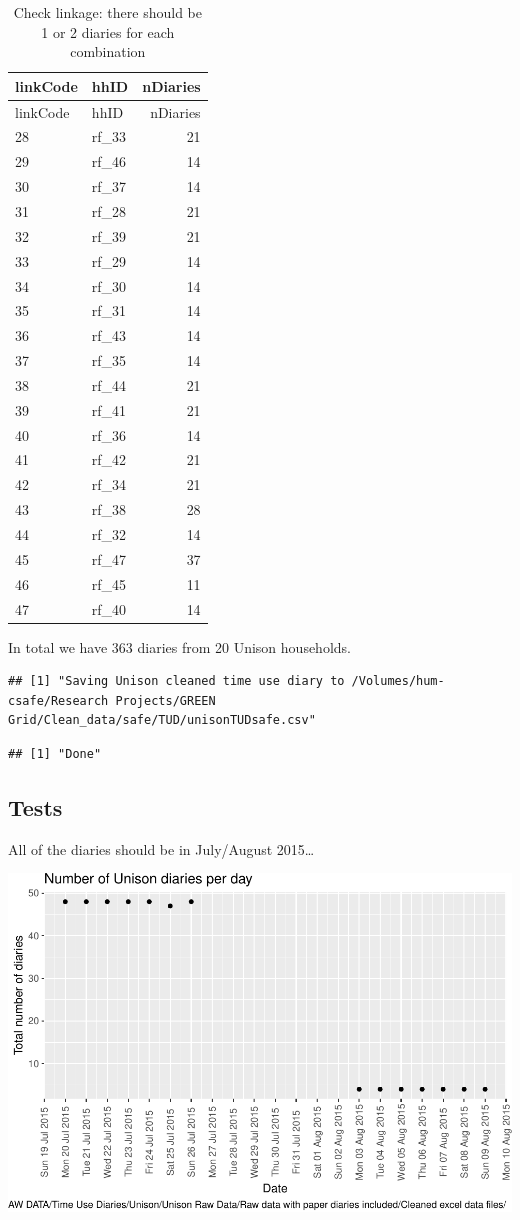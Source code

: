 \documentclass[]{article}
\begin{document}
\begin{longtable}[]{@{}llr@{}}
\caption{Check linkage: there should be 1 or 2 diaries for each
combination}\tabularnewline
\toprule
linkCode & hhID & nDiaries\tabularnewline
\midrule
\endfirsthead
\toprule
linkCode & hhID & nDiaries\tabularnewline
\midrule
\endhead
28 & rf\_33 & 21\tabularnewline
29 & rf\_46 & 14\tabularnewline
30 & rf\_37 & 14\tabularnewline
31 & rf\_28 & 21\tabularnewline
32 & rf\_39 & 21\tabularnewline
33 & rf\_29 & 14\tabularnewline
34 & rf\_30 & 14\tabularnewline
35 & rf\_31 & 14\tabularnewline
36 & rf\_43 & 14\tabularnewline
37 & rf\_35 & 14\tabularnewline
38 & rf\_44 & 21\tabularnewline
39 & rf\_41 & 21\tabularnewline
40 & rf\_36 & 14\tabularnewline
41 & rf\_42 & 21\tabularnewline
42 & rf\_34 & 21\tabularnewline
43 & rf\_38 & 28\tabularnewline
44 & rf\_32 & 14\tabularnewline
45 & rf\_47 & 37\tabularnewline
46 & rf\_45 & 11\tabularnewline
47 & rf\_40 & 14\tabularnewline
\bottomrule
\end{longtable}

In total we have 363 diaries from 20 Unison households.

\begin{verbatim}
## [1] "Saving Unison cleaned time use diary to /Volumes/hum-csafe/Research Projects/GREEN Grid/Clean_data/safe/TUD/unisonTUDsafe.csv"
\end{verbatim}

\begin{verbatim}
## [1] "Done"
\end{verbatim}

\subsection{Tests}\label{tests-1}

All of the diaries should be in July/August 2015\ldots{}

\includegraphics{processNZGGTUDData_files/figure-latex/unisonDiaryPLot-1.pdf}
\end{document}

